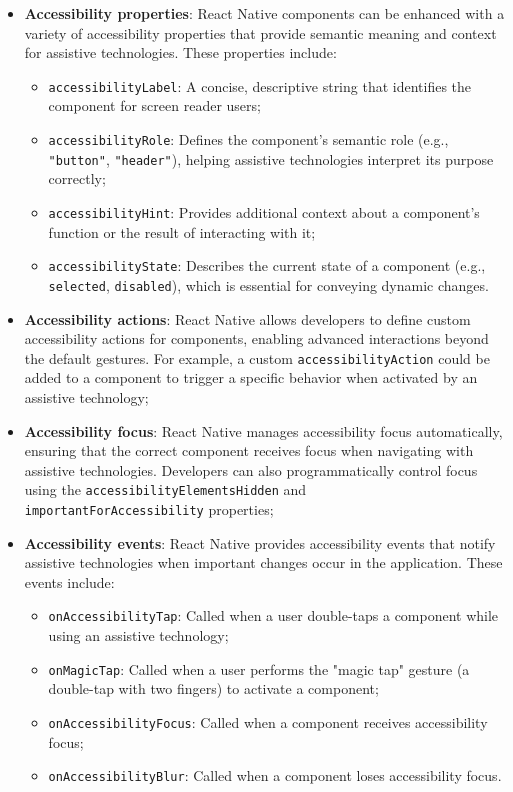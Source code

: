 \begin{itemize}
    \item \textbf{Accessibility properties}: React Native components can be enhanced with a variety of accessibility properties that provide semantic meaning and context for assistive technologies. These properties include:
    \begin{itemize}
        \item \texttt{accessibilityLabel}: A concise, descriptive string that identifies the component for screen reader users;
        \item \texttt{accessibilityRole}: Defines the component's semantic role (e.g., \texttt{"button"}, \texttt{"header"}), helping assistive technologies interpret its purpose correctly;
        \item \texttt{accessibilityHint}: Provides additional context about a component's function or the result of interacting with it;
        \item \texttt{accessibilityState}: Describes the current state of a component (e.g., \texttt{selected}, \texttt{disabled}), which is essential for conveying dynamic changes.
    \end{itemize}
    
    \item \textbf{Accessibility actions}: React Native allows developers to define custom accessibility actions for components, enabling advanced interactions beyond the default gestures. For example, a custom \texttt{accessibilityAction} could be added to a component to trigger a specific behavior when activated by an assistive technology;
    
    \item \textbf{Accessibility focus}: React Native manages accessibility focus automatically, ensuring that the correct component receives focus when navigating with assistive technologies. Developers can also programmatically control focus using the \texttt{accessibilityElementsHidden} and \\\texttt{importantForAccessibility} properties;
    
    \item \textbf{Accessibility events}: React Native provides accessibility events that notify assistive technologies when important changes occur in the application. These events include:
    \begin{itemize}
        \item \texttt{onAccessibilityTap}: Called when a user double-taps a component while using an assistive technology;
        \item \texttt{onMagicTap}: Called when a user performs the "magic tap" gesture (a double-tap with two fingers) to activate a component;
        \item \texttt{onAccessibilityFocus}: Called when a component receives accessibility focus;
        \item \texttt{onAccessibilityBlur}: Called when a component loses accessibility focus.
    \end{itemize}
\end{itemize}

